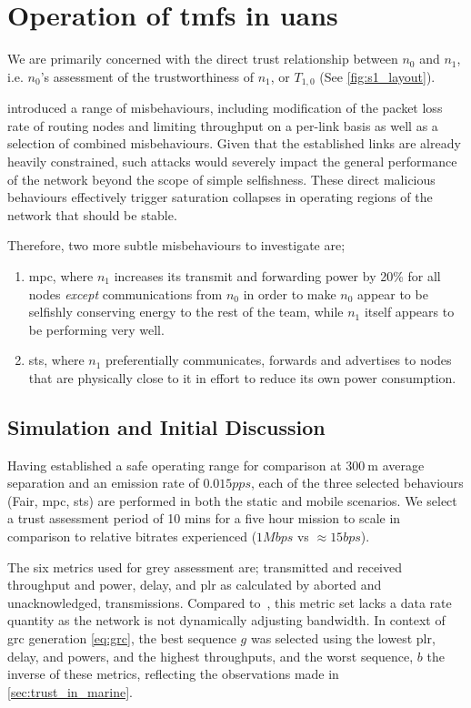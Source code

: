 \section{Operation of \glspl{tmf} in \glspl{uan}}\label{sec:uantmf}

We are primarily concerned with the direct trust relationship between $n_0$ and $n_1$, i.e. $n_0$'s assessment of the trustworthiness of $n_1$, or $T_{1,0}$ (See \autoref{fig:s1_layout}).

\citet{Guo11} introduced a range of misbehaviours, including modification of the packet loss rate of routing nodes and limiting throughput on a per-link basis as well as a selection of combined misbehaviours. 
Given that the established links are already heavily constrained, such attacks would severely impact the general performance of the network beyond the scope of simple selfishness.
These direct malicious behaviours effectively trigger saturation collapses in operating regions of the network that should be stable.

Therefore, two more subtle misbehaviours to investigate are; 
\begin{enumerate}
	\item \acrfull{mpc}, where $n_1$ increases its transmit and forwarding power by 20\% for all nodes \emph{except} communications from $n_0$ in order to make $n_0$ appear to be selfishly conserving energy to the rest of the team, while $n_1$ itself appears to be performing very well.
	\item \acrfull{sts}, where $n_1$ preferentially communicates, forwards and advertises to nodes that are physically close to it in effort to reduce its own power consumption.
\end{enumerate}


\subsection{Simulation and Initial Discussion}\label{sec:trustresultsanddiscussion}

Having established a safe operating range for comparison at $\SI{300}{\meter}$ average separation and an emission rate of $0.015pps$, each of the three selected behaviours (Fair, \gls{mpc}, \gls{sts}) are performed in both the static and mobile scenarios. 
We select a trust assessment period of 10 mins for a five hour mission to scale in comparison to relative bitrates experienced ($1Mbps$ vs $\approx15bps$).

The six metrics used for grey assessment are; transmitted and received throughput and power, delay, and \gls{plr} as calculated by aborted and unacknowledged, transmissions.
Compared to~\cite{Guo11}, this metric set lacks a data rate quantity as the network is not dynamically adjusting bandwidth.
In context of \gls{grc} generation \autoref{eq:grc}, the best sequence $g$ was selected using the lowest \gls{plr}, delay, and powers, and the highest throughputs, and the worst sequence, $b$ the inverse of these metrics, reflecting the observations made in \autoref{sec:trust_in_marine}.


